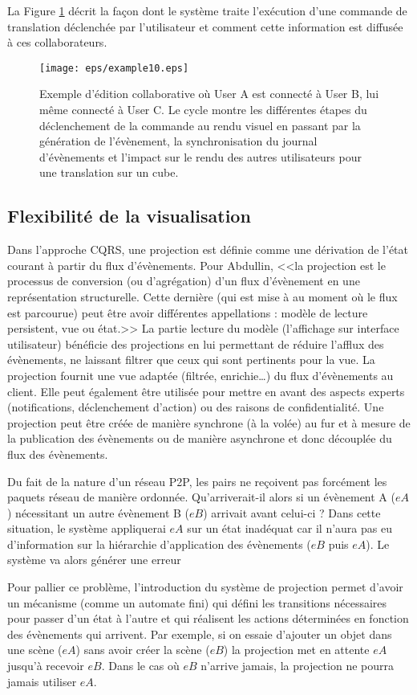 La Figure \ref{fig:cqrs-example} décrit la façon dont le système traite l'exécution 
d'une commande de translation déclenchée par l'utilisateur et comment cette 
information est diffusée à ces collaborateurs.
\begin{figure}[ht]
	\centering
	\texttt{[image: eps/example10.eps]}
	\caption[Flux de la collaboration dans le framework 3DEvent entre 3 
	utilisateurs]{Exemple d'édition collaborative où User A est connecté à User  B, 
		lui 
		même connecté à User C. Le cycle montre les différentes étapes du 
		déclenchement de la commande au rendu visuel en passant par la 
		génération 
		de l'évènement, la 
		synchronisation du journal d'évènements et l'impact sur le rendu des autres 
		utilisateurs pour une translation sur un cube.}\label{fig:cqrs-example}
\end{figure}
\subsection{Flexibilité de la visualisation}
\label{sec:flexviz}
Dans l'approche \gls{CQRS}, une projection est définie comme une dérivation de l'état courant à 
partir du flux d'évènements. Pour Abdullin, <<la projection est le processus de 
conversion (ou d'agrégation) d'un flux d'évènement en une représentation 
structurelle. Cette dernière (qui est mise à au moment où le flux est parcourue) 
peut être avoir différentes appellations : modèle de lecture persistent, vue ou 
état.>>
La partie lecture du modèle (l'affichage sur interface utilisateur) bénéficie des 
projections en lui permettant de réduire l'afflux des évènements, ne laissant filtrer 
que ceux qui sont pertinents pour la vue. La projection fournit une vue adaptée 
(filtrée, enrichie\ldots) du flux d'évènements au client. Elle peut également être 
utilisée pour mettre en avant des aspects experts (notifications, déclenchement 
d'action) ou des raisons de confidentialité.
Une projection peut être créée de manière synchrone (à la volée) au fur et à 
mesure de la publication des évènements ou de manière asynchrone et donc 
découplée du flux des évènements. 


Du fait de la nature d'un réseau \gls{P2P}, les pairs ne reçoivent pas forcément les 
paquets réseau de manière ordonnée.
Qu'arriverait-il alors si un évènement A ($eA$) nécessitant un autre évènement B ($eB$) 
arrivait avant celui-ci ? Dans cette situation, le système appliquerai $eA$ sur un état inadéquat car il n'aura pas eu
d'information sur la hiérarchie d'application des évènements ($eB$ puis $eA$). Le système va alors générer une erreur

Pour pallier ce problème, l'introduction du système de projection permet d'avoir un 
mécanisme (comme un automate fini) qui défini les transitions nécessaires pour 
passer d'un état à l'autre et qui réalisent les actions déterminées en fonction des 
évènements qui arrivent. Par exemple, si on essaie d'ajouter un objet dans une 
scène  ($eA$) sans avoir créer la scène ($eB$) la projection met en attente $eA$ 
jusqu'à recevoir $eB$. Dans le cas où $eB$ n'arrive jamais, la projection ne pourra 
jamais utiliser $eA$.


